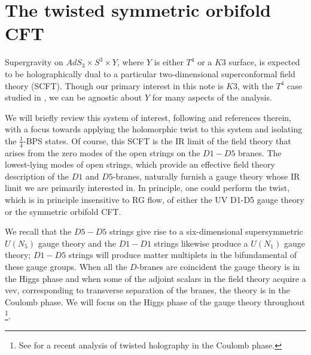 \documentclass[../main.tex]{subfiles}
\begin{document}
\section{The twisted symmetric orbifold CFT}\label{sec:CFT}

Supergravity on $AdS_3 \times S^3 \times Y$, where $Y$ is either $T^4$ or a $K3$ surface, is expected to be holographically dual to a particular two-dimensional superconformal field theory (SCFT). Though our primary interest in this note is $K3$, with the $T^4$ case studied in \cite{CP}, we can be agnostic about $Y$ for many aspects of the analysis. 

We will briefly review this system of interest, following \cite{Davidetal} and references therein, with a focus towards applying the holomorphic twist to this system and isolating the $\frac14$-BPS states. Of course, this SCFT is the IR limit of the field theory that arises from the zero modes of the open strings on the $D1-D5$ branes. 
The lowest-lying modes of open strings, which provide an effective field theory description of the $D1$ and $D5$-branes, naturally furnish a gauge theory whose IR limit we are primarily interested in. In principle, one could perform the twist, which is in principle insensitive to RG flow, of either the UV D1-D5 gauge theory or the symmetric orbifold CFT.

We recall that the $D5-D5$ strings give rise to a six-dimensional supersymmetric $U(N_5)$ gauge theory and the $D1-D1$ strings likewise produce a $U(N_1)$ gauge theory; $D1-D5$ strings will produce matter multiplets in the bifundamental of these gauge groups. When all the $D$-branes are coincident the gauge theory is in the Higgs phase and when some of the adjoint scalars in the field theory acquire a vev, corresponding to transverse separation of the branes, the theory is in the Coulomb phase. 
We will focus on the Higgs phase of the gauge theory throughout \footnote{See \cite{Budzik:2022hcd} for a recent analysis of twisted holography in the Coulomb phase.}.

\end{document}
